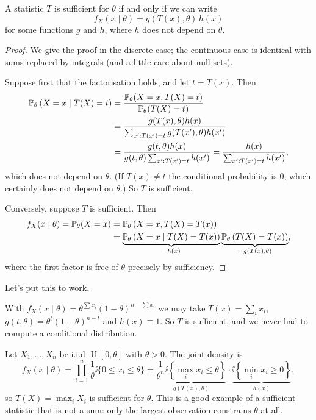 \documentclass[a4paper]{scrartcl}
\newcommand{\Unif}{\operatorname{U}}
\begin{document}
\begin{theorem}
  A statistic $T$ is sufficient for $\theta$ if and only if we can write
  $$
  f_X(x \mid \theta) = g(T(x), \theta)\, h(x)
  $$
  for some functions $g$ and $h$, where $h$ does not depend on $\theta$.
\end{theorem}
\begin{proof}
  We give the proof in the discrete case; the continuous case is identical with sums replaced by integrals (and a little care about null sets).

  Suppose first that the factorisation holds, and let $t = T(x)$. Then
  \begin{align*}
    \mathbb{P}_\theta\left(X = x \mid T(X) = t\right) &= \frac{\mathbb{P}_\theta(X = x, T(X) = t)}{\mathbb{P}_\theta(T(X) = t)}\\
    &= \frac{g(T(x), \theta)h(x)}{\sum_{x' : T(x') = t} g(T(x'), \theta)h(x')}\\
    &= \frac{g(t, \theta)h(x)}{g(t,\theta)\sum_{x' : T(x') = t}h(x')} = \frac{h(x)}{\sum_{x' : T(x') = t}h(x')},
  \end{align*}
  which does not depend on $\theta$. (If $T(x) \neq t$ the conditional probability is $0$, which certainly does not depend on $\theta$.) So $T$ is sufficient.

  Conversely, suppose $T$ is sufficient. Then
  \begin{align*}
    f_X(x\mid\theta) = \mathbb{P}_\theta(X = x) &= \mathbb{P}_\theta\left(X = x, T(X) = T(x)\right)\\
    &= \underbrace{\mathbb{P}_\theta\left(X = x \mid T(X) = T(x)\right)}_{= h(x)}\underbrace{\mathbb{P}_\theta\left(T(X) = T(x)\right)}_{= g(T(x), \theta)},
  \end{align*}
  where the first factor is free of $\theta$ precisely by sufficiency. \qedhere
\end{proof}

Let's put this to work.

\begin{example}
  With $f_X(x \mid \theta) = \theta^{\sum x_i}(1-\theta)^{n - \sum x_i}$ we may take $T(x) = \sum_i x_i$, $g(t, \theta) = \theta^t(1-\theta)^{n-t}$ and $h(x) \equiv 1$. So $T$ is sufficient, and we never had to compute a conditional distribution.
\end{example}

\begin{example}[Uniform on {$[0,\theta]$}]
  Let $X_1, \dots, X_n$ be i.i.d $\Unif[0, \theta]$ with $\theta > 0$. The joint density is
  $$
  f_X(x \mid \theta) = \prod_{i=1}^n \frac{1}{\theta}\ii\{0 \leq x_i \leq \theta\} = \underbrace{\frac{1}{\theta^n}\ii\left\{\max_i x_i \leq \theta\right\}}_{g(T(x), \theta)} \cdot \underbrace{\ii\left\{\min_i x_i \geq 0\right\}}_{h(x)},
  $$
  so $T(X) = \max_i X_i$ is sufficient for $\theta$. This is a good example of a sufficient statistic that is not a sum: only the largest observation constrains $\theta$ at all.
\end{example}
\end{document}
